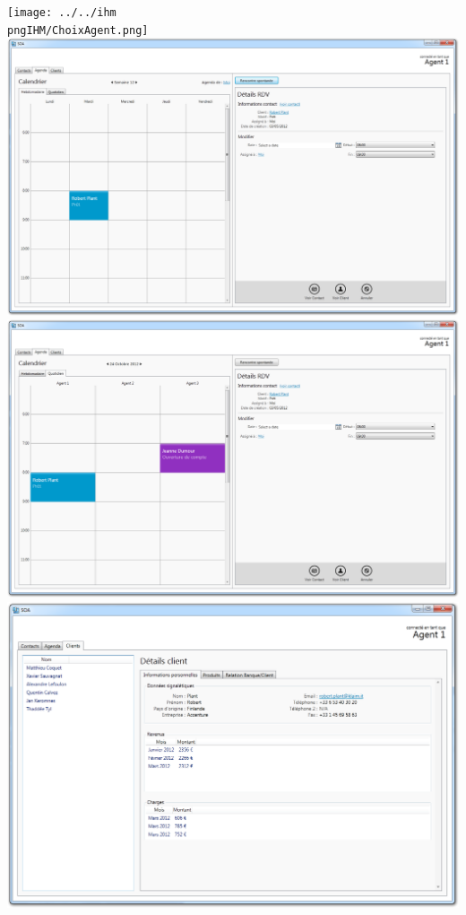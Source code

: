 \texttt{[image: ../../ihm\\pngIHM/ChoixAgent.png]}
\includegraphics[width=\textwidth]{../../ihm/pngIHM/Calendrier Hebdomadaire.png}
\includegraphics[width=\textwidth]{../../ihm/pngIHM/CalendrierQuotidien.png}
\includegraphics[width=\textwidth]{../../ihm/pngIHM/ListeClients.png}
